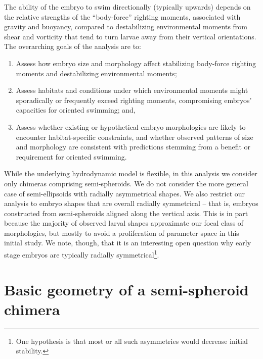 \documentclass[10pt,a4paper]{article}
\begin{document}
The ability of the embryo to swim directionally (typically upwards) depends on the relative strengths of the ``body-force'' righting moments, associated with gravity and buoyancy, compared to destabilizing environmental moments from shear and vorticity that tend to turn larvae away from their vertical orientations.
The overarching goals of the analysis are to:
\begin{enumerate}
	\item Assess how embryo size and morphology affect stabilizing body-force righting moments and destabilizing environmental moments; 
	\item Assess habitats and conditions under which environmental moments might sporadically or frequently exceed righting moments, compromising embryos' capacities for oriented swimming; and, 
	\item Assess whether existing or hypothetical embryo morphologies are likely to encounter habitat-specific constraints, and whether observed patterns of size and morphology are consistent with predictions stemming from a benefit or requirement for oriented swimming.
\end{enumerate}
While the underlying hydrodynamic model is flexible, in this analysis we consider only chimeras comprising semi-spheroids.
We do not consider the more general case of semi-ellipsoids with radially asymmetrical shapes.
We also restrict our analysis to embryo shapes that are overall radially symmetrical -- that is, embryos constructed from semi-spheroids aligned along the vertical axis. 
This is in part because the majority of observed larval shapes approximate our focal class of morphologies, but mostly to avoid a proliferation of parameter space in this initial study. 
We note, though, that it is an interesting open question why early stage embryos are typically radially symmetrical\footnote{One hypothesis is that most or all such asymmetries would decrease initial stability.}. 

\section{Basic geometry of a semi-spheroid chimera}\label{GeomSect}
\end{document}
